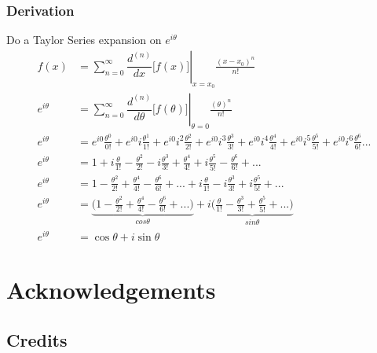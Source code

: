 \documentclass[11pt]{book}
\begin{document}
\subsection{Derivation}
Do a Taylor Series expansion on \(e^{i\theta}\)
\begin{align*}
f(x) &= \sum_{n=0}^{\infty}{\left.\dfrac{d^{(n)}}{dx}\bigg[f(x)\bigg]\right|_{x=x_0}\frac{(x-x_0)^n}{n!}} \\
e^{i\theta} &= \sum_{n=0}^{\infty}{\left.\dfrac{d^{(n)}}{d\theta}\bigg[f(\theta)\bigg]\right|_{\theta=0}\frac{(\theta)^n}{n!}} \\
e^{i\theta} &= e^{i0}\frac{\theta^0}{0!} + e^{i0}i\frac{\theta^1}{1!} +e^{i0}i^2\frac{\theta^2}{2!}+e^{i0}i^3\frac{\theta^3}{3!}+e^{i0}i^4\frac{\theta^4}{4!}+e^{i0}i^5\frac{\theta^5}{5!}+e^{i0}i^6\frac{\theta^6}{6!}... \\
e^{i\theta} &= 1 + i\frac{\theta}{1!} - \frac{\theta^2}{2!}-i\frac{\theta^3}{3!}+\frac{\theta^4}{4!}+i\frac{\theta^5}{5!}-\frac{\theta^6}{6!}+... \\
e^{i\theta} &= 1 - \frac{\theta^2}{2!}+\frac{\theta^4}{4!}-\frac{\theta^6}{6!} + ... + i\frac{\theta}{1!}-i\frac{\theta^3}{3!}+i\frac{\theta^5}{5!} + ... \\
e^{i\theta} &= \underbrace{\bigg(1 - \frac{\theta^2}{2!}+\frac{\theta^4}{4!}-\frac{\theta^6}{6!} + ...\bigg)}_{cos\theta} + i\underbrace{\bigg(\frac{\theta}{1!}-\frac{\theta^3}{3!}+\frac{\theta^5}{5!} + ...\bigg)}_{sin\theta} \\
e^{i\theta} &= \cos{\theta} + i\sin{\theta}
\end{align*}

\chapter*{Acknowledgements}

\section*{Credits}
\end{document}
